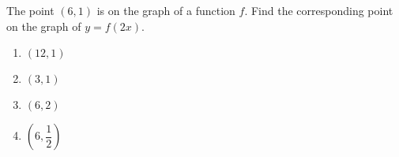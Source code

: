 
\bigskip

\item The point $(6,1)$ is on the graph of a function $f$.  Find the corresponding point on the graph of $y = f(2x)$.
	
	\begin{enumerate}
		\item $(12,1)$
		\item $(3,1)$
		\item $(6,2)$
		\item $(6,\dfrac{1}{2})$
	\end{enumerate}
	

